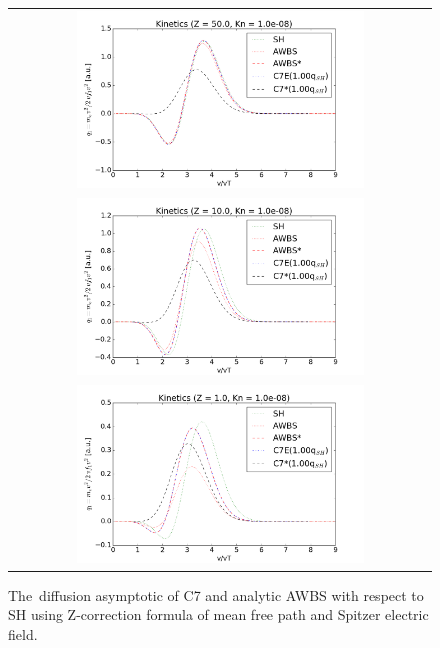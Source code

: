 \documentclass[preprint,12pt]{elsarticle}
\begin{document}
\begin{figure}[tbh]
  \begin{center}
    \begin{tabular}{c}
      \includegraphics[width=0.7\textwidth]{../results/fe_analysis/figs/P5_kinetics_Z50_Kn1e-8.png} \\ 
      \includegraphics[width=0.7\textwidth]{../results/fe_analysis/figs/P5_kinetics_Z10_Kn1e-8.png} \\ 
      \includegraphics[width=0.7\textwidth]{../results/fe_analysis/figs/P5_kinetics_Z1_Kn1e-8.png}
    \end{tabular}
  \caption{
  The~diffusion asymptotic of C7 and analytic AWBS with respect to SH using 
  Z-correction formula of mean free path and Spitzer electric field.
  }
  \end{center}
  \label{fig:AWBSvsSH_f1}
\end{figure}
\end{document}
